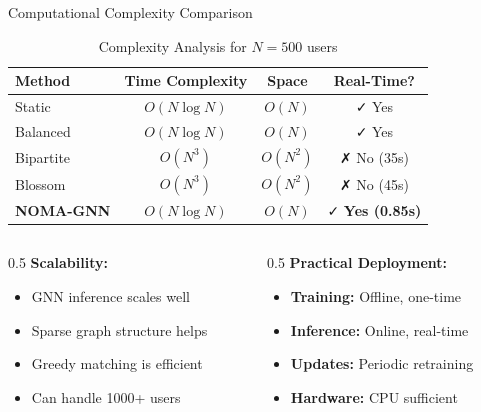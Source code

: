 \documentclass[aspectratio=169]{beamer}
\begin{document}
\begin{frame}{Computational Complexity Comparison}
    \begin{table}
        \centering
        \begin{tabular}{lccc}
            \toprule
            \textbf{Method} & \textbf{Time Complexity} & \textbf{Space} & \textbf{Real-Time?} \\
            \midrule
            Static & $O(N \log N)$ & $O(N)$ & ✓ Yes \\
            Balanced & $O(N \log N)$ & $O(N)$ & ✓ Yes \\
            Bipartite & $O(N^3)$ & $O(N^2)$ & ✗ No (35s) \\
            Blossom & $O(N^3)$ & $O(N^2)$ & ✗ No (45s) \\
            \midrule
            \rowcolor{lightgreen}
            \textbf{NOMA-GNN} & $O(N \log N)$ & $O(N)$ & ✓ \textbf{Yes (0.85s)} \\
            \bottomrule
        \end{tabular}
        \caption{Complexity Analysis for $N=500$ users}
    \end{table}
    
    \vspace{0.3cm}
    
    \begin{columns}
        \begin{column}{0.5\textwidth}
            \textbf{Scalability:}
            \begin{itemize}
                \item GNN inference scales well
                \item Sparse graph structure helps
                \item Greedy matching is efficient
                \item Can handle 1000+ users
            \end{itemize}
        \end{column}
        \begin{column}{0.5\textwidth}
            \textbf{Practical Deployment:}
            \begin{itemize}
                \item \textbf{Training:} Offline, one-time
                \item \textbf{Inference:} Online, real-time
                \item \textbf{Updates:} Periodic retraining
                \item \textbf{Hardware:} CPU sufficient
            \end{itemize}
        \end{column}
    \end{columns}
\end{frame}
\end{document}
